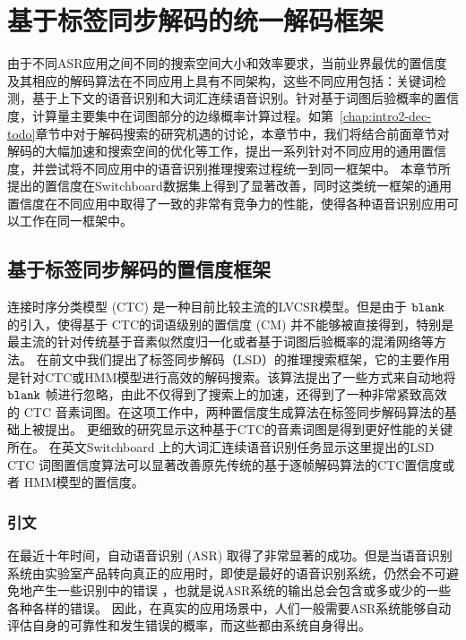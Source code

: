 
\chapter{基于标签同步解码的统一解码框架}
\label{chap:unify}

由于不同ASR应用之间不同的搜索空间大小和效率要求，当前业界最优的置信度及其相应的解码算法在不同应用上具有不同架构，这些不同应用包括：关键词检测，基于上下文的语音识别和大词汇连续语音识别。针对基于词图后验概率的置信度，计算量主要集中在词图部分的边缘概率计算过程。如第~\ref{chap:intro2-dec-todo}章节中对于解码搜索的研究机遇的讨论，本章节中，我们将结合前面章节对解码的大幅加速和搜索空间的优化等工作，提出一系列针对不同应用的通用置信度，并尝试将不同应用中的语音识别推理搜索过程统一到同一框架中。
本章节所提出的置信度在Switchboard数据集上得到了显著改善，同时这类统一框架的通用置信度在不同应用中取得了一致的非常有竞争力的性能，使得各种语音识别应用可以工作在同一框架中。

\section{基于标签同步解码的置信度框架}
\label{chap:unify-confidence}


连接时序分类模型 (CTC) 是一种目前比较主流的LVCSR模型。但是由于 $\tt blank$ 的引入，使得基于 CTC的词语级别的置信度 (CM) 并不能够被直接得到，特别是最主流的针对传统基于音素似然度归一化或者基于词图后验概率的混淆网络等方法。
在前文中我们提出了标签同步解码（LSD）的推理搜索框架，它的主要作用是针对CTC或HMM模型进行高效的解码搜索。该算法提出了一些方式来自动地将 $\tt blank$ 帧进行忽略，由此不仅得到了搜索上的加速，还得到了一种非常紧致高效的 CTC 音素词图。在这项工作中，两种置信度生成算法在标签同步解码算法的基础上被提出。
更细致的研究显示这种基于CTC的音素词图是得到更好性能的关键所在。
在英文Switchboard 上的大词汇连续语音识别任务显示这里提出的LSD CTC 词图置信度算法可以显著改善原先传统的基于逐帧解码算法的CTC置信度或者 HMM模型的置信度。

\subsection{引文}
\label{sec:intro}

在最近十年时间，自动语音识别 (ASR) 取得了非常显著的成功。但是当语音识别系统由实验室产品转向真正的应用时，即使是最好的语音识别系统，仍然会不可避免地产生一些识别中的错误 \cite{ruan2016speech}，也就是说ASR系统的输出总会包含或多或少的一些各种各样的错误。
因此，在真实的应用场景中，人们一般需要ASR系统能够自动评估自身的可靠性和发生错误的概率，而这些都由系统自身得出。

